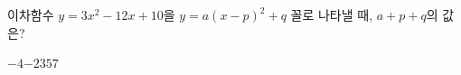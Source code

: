 이차함수 $y=3x^2-12x+10$을 $y=a(x-p)^2+q$ 꼴로 나타낼 때, $a+p+q$의 값은? 
\begin{choices32}{$-4$}{$-2$}{$3$}{$5$}{$7$}\end{choices32}
